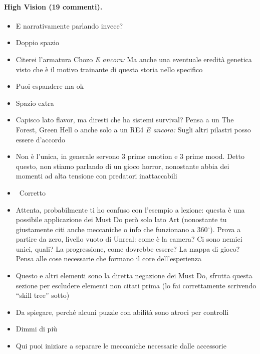\paragraph{High Vision (19 commenti).}
{\small
\begin{itemize}
  \item {} E narrativamente parlando invece?
  \item \rvVuoto Doppio spazio
  \item {} Citerei l'armatura Chozo \emph{E ancora:} Ma anche una eventuale eredità genetica visto che è il motivo trainante di questa storia nello specifico
  \item {} Puoi espandere ma ok
  \item \rvVuoto Spazio extra
  \item {} Capisco lato flavor, ma diresti che ha sistemi survival? Pensa a un The Forest, Green Hell o anche solo a un RE4 \emph{E ancora:} Sugli altri pilastri posso essere d'accordo
  \item {} Non è l'unica, in generale servono 3 prime emotion e 3 prime mood. Detto questo, non stiamo parlando di un gioco horror, nonostante abbia dei momenti ad alta tensione con predatori inattaccabili
  \item {} \rvBene\ Corretto
  \item {} Attenta, probabilmente ti ho confuso con l'esempio a lezione: questa è una possibile applicazione dei Must Do però solo lato Art (nonostante tu giustamente citi anche meccaniche o info che funzionano a 360$^\circ$). Prova a partire da zero, livello vuoto di Unreal: come è la camera? Ci sono nemici unici, quali? La progressione, come dovrebbe essere? La mappa di gioco? Pensa alle cose necessarie che formano il core dell'esperienza
  \item {} Questo e altri elementi sono la diretta negazione dei Must Do, sfrutta questa sezione per escludere elementi non citati prima (lo fai correttamente scrivendo ``skill tree'' sotto)
  \item {} Da spiegare, perché alcuni puzzle con abilità sono atroci per controlli
  \item {} Dimmi di più
  \item {} Qui puoi iniziare a separare le meccaniche necessarie dalle accessorie

\end{itemize}}
